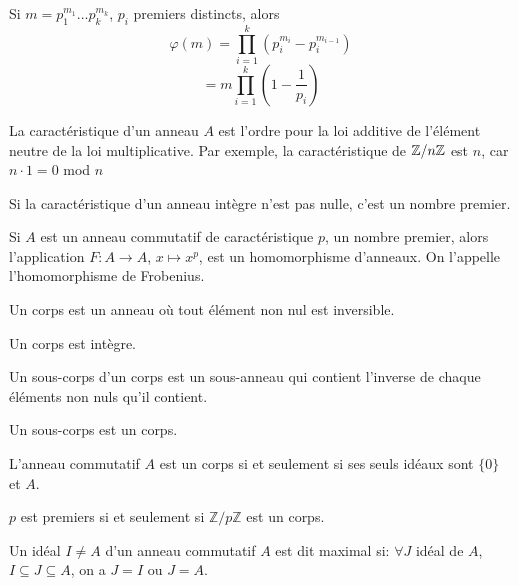 \documentclass[12pt,a4paper]{article}
\begin{document}
\begin{flushleft}
\begin{cor}
Si $m = p_1^{m_1} \ldots p_k^{m_k}$, $p_i$ premiers distincts, alors 
$$ \varphi (m) = \prod_{i = 1}^{k} (p_i^{m_i} - p_i^{m_{i-1}})$$
$$= m \prod_{i = 1}^{k} (1-\frac{1}{p_i}) $$
\end{cor}

\begin{mydef}
La caractéristique d'un anneau $A$ est l'ordre pour la loi additive de l'élément neutre de la loi multiplicative. Par exemple, la caractéristique de $\mathbb{Z} / n \mathbb{Z}$ est $n$, car $n \cdot 1 = 0$ mod $n$
\end{mydef}

\begin{prop}
Si la caractéristique d'un anneau intègre n'est pas nulle, c'est un nombre premier.
\end{prop}

\begin{prop}
Si $A$ est un anneau commutatif de caractéristique $p$, un nombre premier, alors l'application $F: A \rightarrow A$, $x \mapsto x^p$, est un homomorphisme d'anneaux. On l'appelle l'homomorphisme de Frobenius.
\end{prop}

\begin{mydef}
Un corps est un anneau où tout élément non nul est inversible.
\end{mydef}

\begin{prop}
Un corps est intègre.
\end{prop}

\begin{mydef}
Un sous-corps d'un corps est un sous-anneau qui contient l'inverse de chaque éléments non nuls qu'il contient.
\end{mydef}

\begin{rem}
Un sous-corps est un corps.
\end{rem}

\begin{prop}
L'anneau commutatif $A$ est un corps si et seulement si ses seuls idéaux sont $\{ 0 \}$ et $A$.
\end{prop}

\begin{prop}
$p$ est premiers si et seulement si $\mathbb{Z}/ p \mathbb{Z}$ est un corps.
\end{prop}

\begin{mydef}
Un idéal $I \neq A$ d'un anneau commutatif $A$ est dit maximal si:
$\forall J$ idéal de $A$, $I \subseteq J \subseteq A$, on a $J = I$ ou $J = A$.
\end{mydef}


\end{flushleft}
\end{document}
